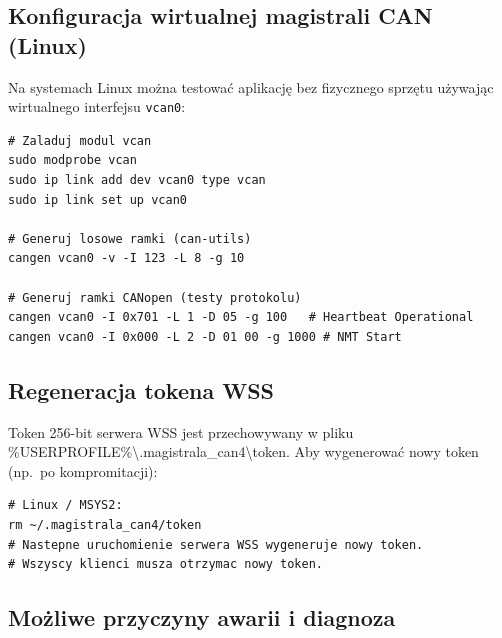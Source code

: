 \documentclass[12pt, a4paper]{article}
\begin{document}
\subsection{Konfiguracja wirtualnej magistrali CAN (Linux)}

Na systemach Linux można testować aplikację bez fizycznego sprzętu
używając wirtualnego interfejsu \texttt{vcan0}:

\begin{lstlisting}[style=cpp, caption={Konfiguracja vcan0 i generowanie ramek testowych}]
# Zaladuj modul vcan
sudo modprobe vcan
sudo ip link add dev vcan0 type vcan
sudo ip link set up vcan0

# Generuj losowe ramki (can-utils)
cangen vcan0 -v -I 123 -L 8 -g 10

# Generuj ramki CANopen (testy protokolu)
cangen vcan0 -I 0x701 -L 1 -D 05 -g 100   # Heartbeat Operational
cangen vcan0 -I 0x000 -L 2 -D 01 00 -g 1000 # NMT Start
\end{lstlisting}

\subsection{Regeneracja tokena WSS}

Token 256-bit serwera WSS jest przechowywany w pliku
{\footnotesize\ttfamily \%USERPROFILE\%\textbackslash{}\linebreak[4].magistrala\_can4\textbackslash{}\linebreak[4]token}.
Aby wygenerować nowy token (np.\ po kompromitacji):

\begin{lstlisting}[style=cpp, caption={Regeneracja tokena WSS}]
# Linux / MSYS2:
rm ~/.magistrala_can4/token
# Nastepne uruchomienie serwera WSS wygeneruje nowy token.
# Wszyscy klienci musza otrzymac nowy token.
\end{lstlisting}

\subsection{Możliwe przyczyny awarii i diagnoza}
\end{document}
